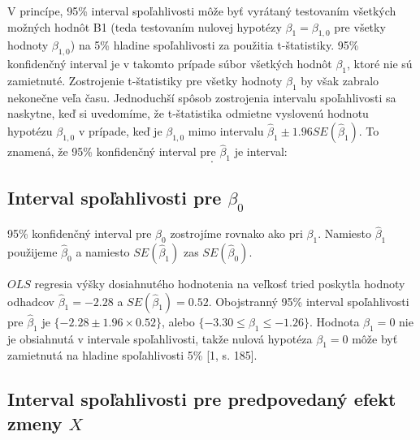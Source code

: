 \documentclass[]{tukediphc}
\begin{document}
V princípe, 95\% interval spoľahlivosti môže byť vyrátaný testovaním všetkých možných hodnôt B1 (teda testovaním nulovej hypotézy $\beta_{1} = \beta_{1, 0}$ pre všetky hodnoty $\beta_{1, 0}$) na 5\% hladine spoľahlivosti za použitia t-štatistiky. 95\% konfidenčný interval je v takomto prípade súbor všetkých hodnôt $\beta_{1}$, ktoré nie sú zamietnuté. Zostrojenie t-štatistiky pre všetky hodnoty $\beta_{1}$ by však zabralo nekonečne veľa času. 
Jednoduchší spôsob zostrojenia intervalu spoľahlivosti sa naskytne, keď si uvedomíme, že t-štatistika odmietne vyslovenú hodnotu hypotézu $\beta_{1, 0}$ v prípade, keď je $\beta_{1, 0}$ mimo intervalu $\hat\beta_{1} \pm 1.96SE(\hat\beta_{1})$. To znamená, že 95\% konfidenčný interval pre $\hat\beta_{1}$ je interval: 
\begin{equation}
    [\hat\beta_{1} - 1.96SE(\hat\beta_{1}) \ , \ \hat\beta_{1} + 1.96SE(\hat\beta_{1})].
\end{equation}

\subsection{Interval spoľahlivosti pre $\beta_0$}

95\% konfidenčný interval pre $\beta_0$ zostrojíme rovnako ako pri $\beta_1$. Namiesto $\hat\beta_1$  použijeme $\hat\beta_0$  a namiesto $SE(\hat\beta_{1})$ zas $SE(\hat\beta_{0})$.

$OLS$ regresia výšky dosiahnutého hodnotenia na veľkosť tried poskytla hodnoty odhadcov $\hat\beta_{1} = -2.28$ a $SE(\hat\beta_{1}) = 0.52$. Obojstranný 95\% interval spoľahlivosti pre $\hat\beta_{1}$ je $\{-2.28 \pm 1.96 \times 0.52\}$, alebo $\{-3.30 \leq \beta_{1} \leq -1.26\}$. Hodnota $\beta_{1} = 0$ nie je obsiahnutá v intervale spoľahlivosti, takže nulová hypotéza $\beta_{1} = 0$ môže byť zamietnutá na hladine spoľahlivosti 5\% [1, s. 185]. 

\subsection{Interval spoľahlivosti pre predpovedaný efekt zmeny $X$}
\end{document}
